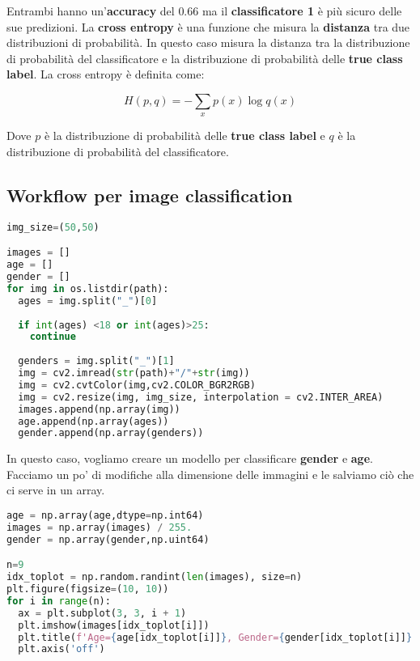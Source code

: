 Entrambi hanno un'\textbf{accuracy} del $0.66$ ma il \textbf{classificatore 1} è
più sicuro delle sue predizioni. La \textbf{cross entropy} è una funzione che
misura la \textbf{distanza} tra due distribuzioni di probabilità. In questo caso
misura la distanza tra la distribuzione di probabilità del classificatore e la
distribuzione di probabilità delle \textbf{true class label}. La cross entropy
è definita come:

\begin{equation}
    H(p,q) = - \sum_{x} p(x) \log q(x)
\end{equation}

Dove $p$ è la distribuzione di probabilità delle \textbf{true class label} e $q$
è la distribuzione di probabilità del classificatore. 


\subsection{Workflow per image classification}


\begin{lstlisting}[language=Python, caption=Workflow per image classification]
img_size=(50,50)

images = []
age = []
gender = []
for img in os.listdir(path):
  ages = img.split("_")[0]
  
  if int(ages) <18 or int(ages)>25:
    continue
  
  genders = img.split("_")[1]
  img = cv2.imread(str(path)+"/"+str(img))
  img = cv2.cvtColor(img,cv2.COLOR_BGR2RGB)
  img = cv2.resize(img, img_size, interpolation = cv2.INTER_AREA)
  images.append(np.array(img))
  age.append(np.array(ages))
  gender.append(np.array(genders))

\end{lstlisting}

In questo caso, vogliamo creare un modello per classificare \textbf{gender} e \textbf{age}. Facciamo un po' di modifiche alla dimensione
delle immagini e le salviamo ciò che ci serve in un array.

\begin{lstlisting}[language=Python, caption=Workflow per image classification]
age = np.array(age,dtype=np.int64)
images = np.array(images) / 255.  
gender = np.array(gender,np.uint64)

n=9
idx_toplot = np.random.randint(len(images), size=n)
plt.figure(figsize=(10, 10))
for i in range(n):
  ax = plt.subplot(3, 3, i + 1)
  plt.imshow(images[idx_toplot[i]])
  plt.title(f'Age={age[idx_toplot[i]]}, Gender={gender[idx_toplot[i]]}')
  plt.axis('off')
\end{lstlisting}

